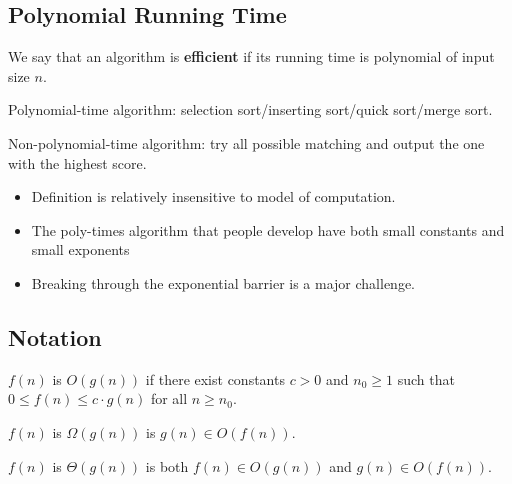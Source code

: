 \subsection{Polynomial Running Time}
\begin{definition}
    We say that an algorithm is \textbf{efficient} if its running time is polynomial of input size  $ n $. 
\end{definition}
\begin{example}
    Polynomial-time algorithm: selection sort/inserting sort/quick sort/merge sort.

    Non-polynomial-time algorithm: try all possible matching and output the one with the highest score.
\end{example}
\begin{itemize}
    \item Definition is relatively insensitive to model of computation.
    \item The poly-times algorithm that people develop have both small constants and small exponents
    \item Breaking through the exponential barrier is a major challenge.
\end{itemize}
\subsection{Notation}
\begin{definition}
    $ f(n) $ is  $ O(g(n)) $ if there exist constants  $ c>0 $ and  $ n_0 \geq 1 $ such that  $ 0 \leq f(n) \leq c\cdot g(n) $ for all  $ n \geq n_0 $. 
    
     $ f(n) $ is  $ \Omega(g(n)) $ is  $ g(n)\in O(f(n)) $.
     
     $ f(n)  $ is  $ \Theta(g(n)) $ is both  $ f(n)\in O(g(n)) $ and  $ g(n)\in O(f(n)) $.   
\end{definition}
